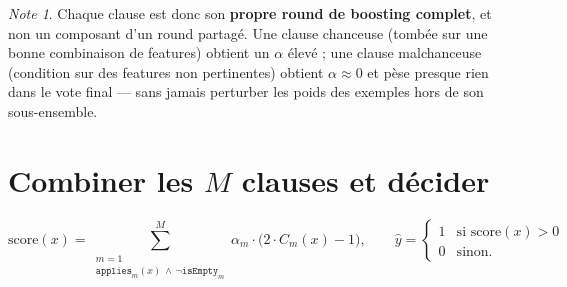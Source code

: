 \documentclass[12pt,a4paper]{article}
\newcommand{\code}[1]{\texttt{#1}}
\theoremstyle{remark}
\newtheorem{note}{Note}[section]
\begin{document}
\begin{note}
Chaque clause est donc son \textbf{propre round de boosting complet}, et non
un composant d'un round partagé. Une clause chanceuse (tombée sur une bonne
combinaison de features) obtient un $\alpha$ élevé ; une clause malchanceuse
(condition sur des features non pertinentes) obtient $\alpha\approx0$ et pèse
presque rien dans le vote final --- sans jamais perturber les poids des
exemples hors de son sous-ensemble.
\end{note}

\section{Combiner les $M$ clauses et décider}\label{sec:combine}

\[
  \mathrm{score}(x) = \sum_{\substack{m=1 \\ \code{applies}_m(x) \,\wedge\, \neg\code{isEmpty}_m}}^{M}
  \alpha_m \cdot \big(2\cdot C_m(x) - 1\big),
  \qquad
  \hat y = \begin{cases}1 & \text{si } \mathrm{score}(x) > 0\\ 0 & \text{sinon.}\end{cases}
\]
\end{document}
